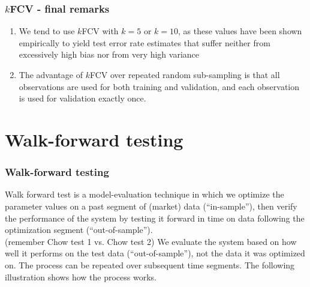 \documentclass{beamer}
\begin{document}

\begin{frame}

\frametitle{$k$FCV - final remarks}

\begin{enumerate}

  \item We tend to use $k$FCV with $k = 5$ or $k = 10$, as these values have been shown empirically to yield test error rate estimates that suffer neither from excessively high bias nor from very high variance
  \vspace{0.5cm}
  \item The advantage of $k$FCV over repeated random sub-sampling is that all observations are used for both training and validation, and each observation is used for validation exactly once.
  
\end{enumerate}  

\end{frame}

\section{Walk-forward testing} 


\begin{frame}
\frametitle{Walk-forward testing}

Walk forward test is a model-evaluation technique in which we optimize the parameter values on a past segment of (market) data (``in-sample''), then verify the performance of the system by testing it forward in time on data following the optimization segment (``out-of-sample''). \\
(remember Chow test 1 vs. Chow test 2)
\medskip
We evaluate the system based on how well it performs on the test data (``out-of-sample''), not the data it was optimized on.
\medskip
The process can be repeated over subsequent time segments. 
\medskip
The following illustration shows how the process works.
\end{frame}

\end{document}
